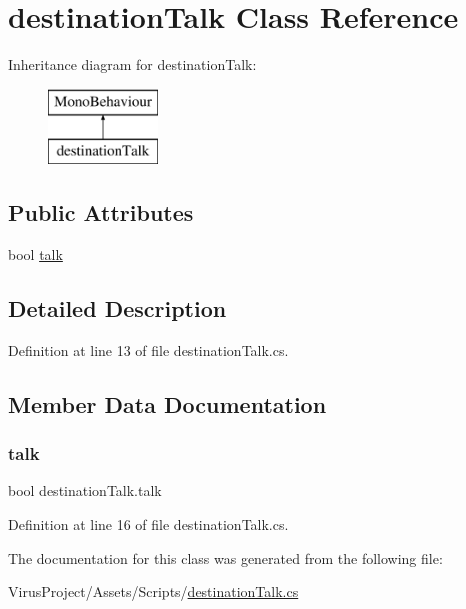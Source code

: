 \hypertarget{classdestination_talk}{}\section{destination\+Talk Class Reference}
\label{classdestination_talk}
Inheritance diagram for destination\+Talk\+:\begin{figure}[H]
\begin{center}
\leavevmode
\includegraphics[height=2.000000cm]{classdestination_talk}
\end{center}
\end{figure}
\subsection*{Public Attributes}
\begin{DoxyCompactItemize}
\item 
bool \hyperlink{classdestination_talk_aa9bf6e6e6c6d707c5aa33de9afa0c947}{talk}
\end{DoxyCompactItemize}


\subsection{Detailed Description}


Definition at line 13 of file destination\+Talk.\+cs.



\subsection{Member Data Documentation}
\hypertarget{classdestination_talk_aa9bf6e6e6c6d707c5aa33de9afa0c947}{}\label{classdestination_talk_aa9bf6e6e6c6d707c5aa33de9afa0c947} 
\subsubsection{\texorpdfstring{talk}{talk}}
{\footnotesize\ttfamily bool destination\+Talk.\+talk}



Definition at line 16 of file destination\+Talk.\+cs.



The documentation for this class was generated from the following file\+:\begin{DoxyCompactItemize}
\item 
Virus\+Project/\+Assets/\+Scripts/\hyperlink{destination_talk_8cs}{destination\+Talk.\+cs}\end{DoxyCompactItemize}
